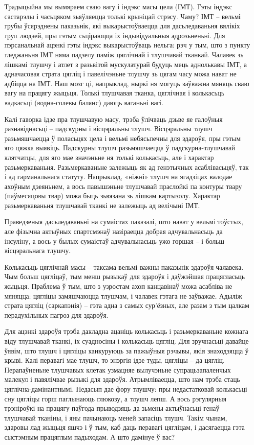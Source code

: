 Традыцыйна мы вымяраем сваю вагу і індэкс масы цела (ІМТ). Гэты індэкс састарэлы і часьцяком зьяўляецца толькі крыніцай стрэсу. Чаму? ІМТ – вельмі грубы ўсярэднены паказьнік, які выкарыстоўваецца для дасьледаваньня вялікіх груп людзей, пры гэтым сьціраюцца іх індывідуальныя адрозьненьні. Для пэрсанальнай ацэнкі гэты індэкс выкарыстоўваць нельга: рэч у тым, што з пункту гледжаньня ІМТ няма падзелу паміж цяглічнай і тлушчавай тканкай. Чалавек зь лішкамі тлушчу і атлет з разьвітой мускулатурай будуць мець аднолькавы ІМТ, а адначасовая страта цягліц і павелічэньне тлушчу зь цягам часу можа нават не адбіцца на ІМТ. Наш мозг ці, напрыклад, ныркі ня могуць заўважна мяняць сваю вагу на працягу жыцьця. Толькі тлушчавая тканка, цяглічная і колькасьць вадкасьці (водна-солевы балянс) даюць ваганьні вагі.

Калі гаворка ідзе пра тлушчавую масу, трэба ўлічваць дзьве яе галоўныя разнавіднасьці – падскурны і вісцэральны тлушч. Вісцэральны тлушч разьмяшчаецца ў поласьцях цела і вельмі небясьпечны для здароўя, пры гэтым яго цяжка выявіць. Падскурны тлушч разьмяшчаецца ў падскурна-тлушчавай клятчатцы, для яго мае значэньне ня толькі колькасьць, але і характар разьмеркаваньня. Разьмеркаваньне залежыць як ад генэтычных асаблівасьцяў, так і ад гарманальнага статуту. Напрыклад, «ніжні» тлушч на ягадзіцах валодае ахоўным дзеяньнем, а вось павышэньне тлушчавай праслойкі па контуры твару (паўмесяцовы твар) можа быць зьвязана зь лішкам картызолу. Характар разьмеркаваньня тлушчавай тканкі не залежыць ад велічыні ІМТ.

Праведзеныя дасьледаваньні на сумаістах паказалі, што нават у вельмі тоўстых, але фізычна актыўных спартсмэнаў назіраецца добрая адчувальнасьць да інсуліну, а вось у былых сумаістаў адчувальнасьць ужо горшая – і больш вісцэральнага тлушчу.

Колькасьць цяглічнай масы – таксама вельмі важны паказьнік здароўя чалавека. Чым больш цягліцаў, тым менш рызыкаў для здароўя і даўжэйшая працягласьць жыцьця. Праблема ў тым, што з узростам ахоп канцавінаў можа асабліва не мяняцца: цягліцы замяшчаюцца тлушчам, і чалавек гэтага не заўважае. Адыліж страта цягліц (саркапэнія) – гэта адна з самых сур'ёзных, але разам з тым цалкам перадухільных пагроз для здароўя.

Для ацэнкі здароўя трэба дакладна ацаніць колькасьць і разьмеркаваньне кожнага віду тлушчавай тканкі, іх суадносіны і колькасьць цягліц. Для зручнасьці давайце ўявім, што тлушч і цягліцы канкуруюць за пажыўныя рэчывы, якія знаходзяцца ў крыві. Калі перавагі мае тлушч, то энэргія ідзе туды, цягліцы – да цягліц. Перапаўненьне тлушчавых клетак узмацняе вылучэньне супрацьзапаленчых малекул і павялічвае рызыкі для здароўя. Атрымліваецца, што нам трэба стаць цяглічна-дамінантнымі. Недасып дае фору тлушчу: пры недастатковай колькасьці сну цягліцы горш паглынаюць глюкозу, а тлушч лепш. А вось рэгулярныя трэніроўкі на працягу паўгода прыводзяць да зьмены актыўнасьці генаў тлушчавай тканіны, і яны пачынаюць меней запасіць тлушч. Такім чынам, здаровы лад жыцьця яшчэ і ў тым, каб даць перавагі цягліцам, і дасягаецца гэта сыстэмным працяглым падыходам. А што дамінуе ў вас?

